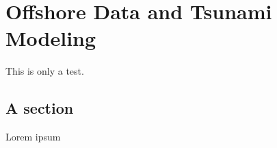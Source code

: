 
\chapter{Offshore Data and Tsunami Modeling}
This is only a test.
\section{A section}
Lorem ipsum





